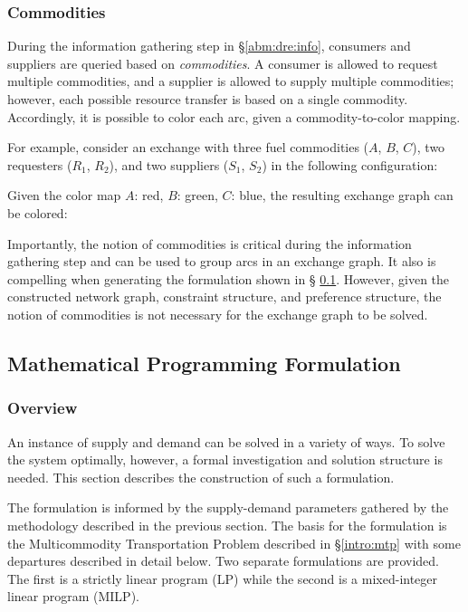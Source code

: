 
\subsubsection{Commodities}

During the information gathering step in \S \ref{abm:dre:info}, consumers and
suppliers are queried based on \textit{commodities}. A consumer is allowed to
request multiple commodities, and a supplier is allowed to supply multiple
commodities; however, each possible resource transfer is based on a single
commodity. Accordingly, it is possible to color each arc, given a
commodity-to-color mapping.

For example, consider an exchange with three fuel commodities ($A$, $B$, $C$),
two requesters ($R_1$, $R_2$), and two suppliers ($S_1$, $S_2$) in the following
configuration:


Given the color map $A$: red, $B$: green, $C$: blue, the resulting exchange
graph can be colored:


Importantly, the notion of commodities is critical during the information
gathering step and can be used to group arcs in an exchange graph. It also is
compelling when generating the formulation shown in \S
\ref{abm:dre:form}. However, given the constructed network graph, constraint
structure, and preference structure, the notion of commodities is not necessary
for the exchange graph to be solved.

\subsection{Mathematical Programming Formulation}\label{abm:dre:form}

\subsubsection{Overview}

An instance of supply and demand can be solved in a variety of ways. To solve
the system optimally, however, a formal investigation and solution structure is
needed. This section describes the construction of such a formulation.

The formulation is informed by the supply-demand parameters gathered by the
methodology described in the previous section. The basis for the formulation is
the Multicommodity Transportation Problem described in \S\ref{intro:mtp} with
some departures described in detail below. Two separate formulations are
provided. The first is a strictly linear program (LP) while the second is a
mixed-integer linear program (MILP).

